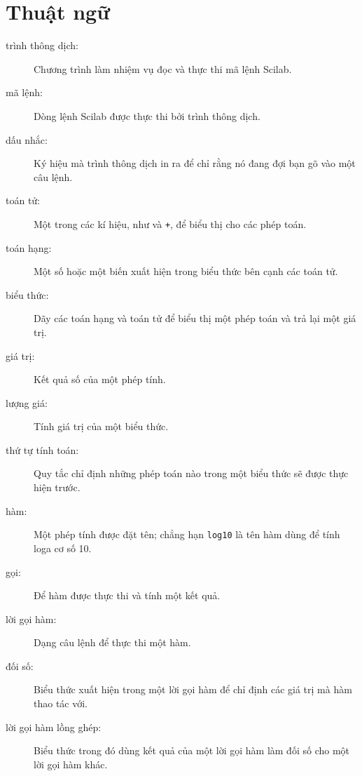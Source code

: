 \documentclass[12pt]{book}
\begin{document}
\section{Thuật ngữ}

\begin{description}

\item[trình thông dịch:] Chương trình làm nhiệm vụ đọc và thực thi mã lệnh Scilab.

\item[mã lệnh:] Dòng lệnh Scilab được thực thi bởi trình thông dịch.

\item[dấu nhắc:] Ký hiệu mà trình thông dịch in ra để chỉ rằng nó đang 
đợi bạn gõ vào một câu lệnh.

\item[toán tử:] Một trong các kí hiệu, như {\tt *} và {\tt +}, để biểu thị cho 
các phép toán.

\item[toán hạng:] Một số hoặc một biến xuất hiện trong biểu thức bên cạnh 
các toán tử.

\item[biểu thức:] Dãy các toán hạng và toán tử để biểu thị một phép toán 
và trả lại một giá trị.

\item[giá trị:] Kết quả số của một phép tính.

\item[lượng giá:] Tính giá trị của một biểu thức.

\item[thứ tự tính toán:] Quy tắc chỉ định những phép toán nào trong một 
biểu thức sẽ được thực hiện trước.

\item[hàm:] Một phép tính được đặt tên; chẳng hạn {\tt log10} là tên hàm
dùng để tính loga cơ số 10.

\item[gọi:] Để hàm được thực thi và tính một kết quả.

\item[lời gọi hàm:] Dạng câu lệnh để thực thi một hàm.

\item[đối số:] Biểu thức xuất hiện trong một lời gọi hàm để chỉ định các
giá trị mà hàm thao tác với.

\item[lời gọi hàm lồng ghép:] Biểu thức trong đó dùng kết quả của một 
lời gọi hàm làm đối số cho một lời gọi hàm khác.


\end{description}
\end{document}
